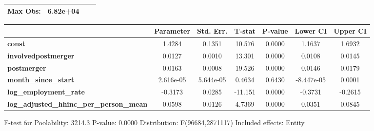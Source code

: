 \documentclass{report}
\begin{document}
\begin{center}
\begin{tabular}{lclc}
\textbf{Max Obs:}                                &       6.82e+04       & \textbf{                     }   &                  \\
\bottomrule
\end{tabular}
\begin{tabular}{lcccccc}
                                                 & \textbf{Parameter} & \textbf{Std. Err.} & \textbf{T-stat} & \textbf{P-value} & \textbf{Lower CI} & \textbf{Upper CI}  \\
\midrule
\textbf{const}                                   &       1.4284       &       0.1351       &      10.576     &      0.0000      &       1.1637      &       1.6932       \\
\textbf{involvedpostmerger}                      &       0.0127       &       0.0010       &      13.301     &      0.0000      &       0.0108      &       0.0145       \\
\textbf{postmerger}                              &       0.0163       &       0.0008       &      19.526     &      0.0000      &       0.0146      &       0.0179       \\
\textbf{month\_since\_start}                     &     2.616e-05      &     5.644e-05      &      0.4634     &      0.6430      &     -8.447e-05    &       0.0001       \\
\textbf{log\_employment\_rate}                   &      -0.3173       &       0.0285       &     -11.151     &      0.0000      &      -0.3731      &      -0.2615       \\
\textbf{log\_adjusted\_hhinc\_per\_person\_mean} &       0.0598       &       0.0126       &      4.7369     &      0.0000      &       0.0351      &       0.0845       \\
\bottomrule
\end{tabular}
\end{center}

F-test for Poolability: 3214.3 \newline
 P-value: 0.0000 \newline
 Distribution: F(96684,2871117) \newline
  \newline
 Included effects: Entity
\end{document}
